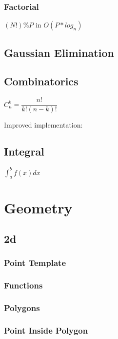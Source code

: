 \documentclass[10pt,a4paper]{report}
\begin{document}
		\subsection{Factorial}
		$(N!)\%P$ in $O(P*log_{n})$ 
			
	\newpage
	\section{Gaussian Elimination}
		
	\newpage
	\section{Combinatorics}
		$C_{n}^{k} = \dfrac{n!}{k!(n-k)!}$
		
		Improved implementation:
		
	\newpage
	\section{Integral}
		$\int_{a}^{b} f(x) dx$
		
	
\chapter{Geometry}
	\section{2d}
		\subsection{Point Template}
			
		\newpage
		\subsection{Functions}
			
		\newpage
		\subsection{Polygons}
			
		\newpage
		\subsection{Point Inside Polygon}
			
		\newpage
\end{document}
